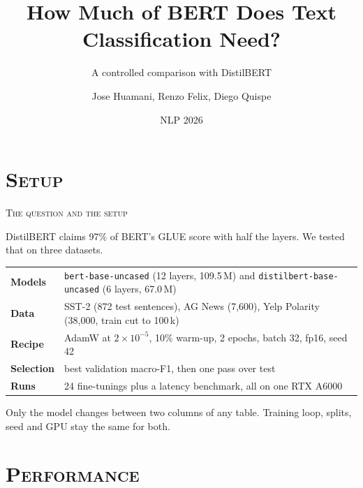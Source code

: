 \documentclass[xcolor={dvipsnames,table}, aspectratio=1610]{beamer}
\title[BERT vs DistilBERT]{How Much of BERT Does Text Classification Need?}
\subtitle{A controlled comparison with DistilBERT}
\author[Huamani, Felix, Quispe]{Jose Huamani, Renzo Felix, Diego Quispe}
\institute[UTEC]{UTEC}
\date{NLP 2026}
\begin{document}
\begin{frame}[plain]
  \slatetitlepage
\end{frame}

\section{\textsc{Setup}}

\begin{frame}{\textsc{The question and the setup}}

  \begin{ProblemBox}
    \small DistilBERT claims 97\% of BERT's GLUE score with half the layers.
    We tested that on three datasets.
  \end{ProblemBox}

  \vspace{1mm}
  \begin{center}\scriptsize
  \begin{tabular}{ll}
    \toprule
    \textbf{Models} & \texttt{bert-base-uncased} (12 layers, 109.5\,M) and
      \texttt{distilbert-base-uncased} (6 layers, 67.0\,M) \\
    \textbf{Data} & SST-2 (872 test sentences), AG News (7{,}600), Yelp
      Polarity (38{,}000, train cut to 100\,k) \\
    \textbf{Recipe} & AdamW at $2\times10^{-5}$, 10\% warm-up, 2 epochs, batch
      32, fp16, seed 42 \\
    \textbf{Selection} & best validation macro-F1, then one pass over test \\
    \textbf{Runs} & 24 fine-tunings plus a latency benchmark, all on one RTX A6000 \\
    \bottomrule
  \end{tabular}
  \end{center}

  \begin{ReminderBox}
    \small Only the model changes between two columns of any table. Training
    loop, splits, seed and GPU stay the same for both.
  \end{ReminderBox}

\end{frame}

\section{\textsc{Performance}}
\end{document}
